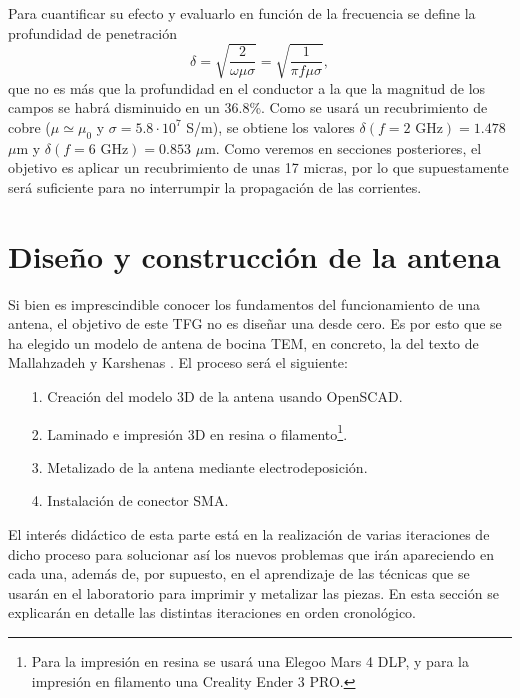 \documentclass[11pt,a4paper,twoside,pdf]{article}
\numberwithin{equation}{section}
\begin{document}
Para cuantificar su efecto y evaluarlo en función de la frecuencia se define la profundidad de penetración
\begin{equation}
    \delta = \sqrt{\frac{2}{\omega\mu\sigma}} = \sqrt{\frac{1}{\pi f\mu\sigma}},
\end{equation}
que no es más que la profundidad en el conductor a la que la magnitud de los campos se habrá disminuido en un 36.8\%. Como se usará un recubrimiento de cobre ($\mu\simeq\mu_0$ y $\sigma=5.8\cdot10^{7}$ S/m), se obtiene los valores $\delta(f=2\text{ GHz})=1.478$ $\mu$m y $\delta(f=6\text{ GHz})=0.853$ $\mu$m. Como veremos en secciones posteriores, el objetivo es aplicar un recubrimiento de unas 17 micras, por lo que supuestamente será suficiente para no interrumpir la propagación de las corrientes.


\section{Diseño y construcción de la antena}\label{sec:dis}

Si bien es imprescindible conocer los fundamentos del funcionamiento de una antena, el objetivo de este TFG no es diseñar una desde cero. Es por esto que se ha elegido un modelo de antena de bocina TEM, en concreto, la del texto de Mallahzadeh y Karshenas \cite{tem_horn}. El proceso será el siguiente:
\begin{itemize}
    \item[1.] Creación del modelo 3D de la antena usando OpenSCAD.
    \item[2.] Laminado e impresión 3D en resina o filamento\footnote{Para la impresión en resina se usará una Elegoo Mars 4 DLP, y para la impresión en filamento una Creality Ender 3 PRO.}.
    \item[3.] Metalizado de la antena mediante electrodeposición.
    \item[4.] Instalación de conector SMA.
\end{itemize}
El interés didáctico de esta parte está en la realización de varias iteraciones de dicho proceso para solucionar así los nuevos problemas que irán apareciendo en cada una, además de, por supuesto, en el aprendizaje de las técnicas que se usarán en el laboratorio para imprimir y metalizar las piezas. En esta sección se explicarán en detalle las distintas iteraciones en orden cronológico.
\end{document}
